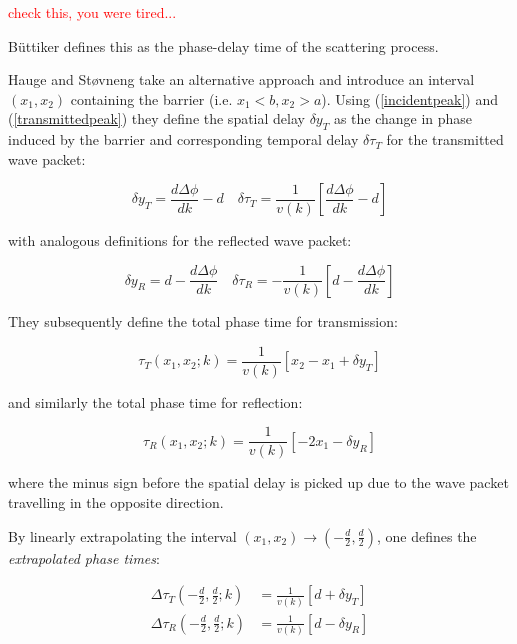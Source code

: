 \documentclass{article}
\begin{document}
\textcolor{red}{check this, you were tired...}

\noindent B{\"u}ttiker defines this as the phase-delay time of the scattering process.

Hauge and St{\o}vneng take an alternative approach and introduce an interval $(x_1, x_2)$ containing the barrier (i.e. $x_1<b,x_2>a$). Using (\ref{incidentpeak}) and (\ref{transmittedpeak}) they define the spatial delay $\delta y_T$ as the change in phase induced by the barrier and corresponding temporal delay $\delta\tau_T$ for the transmitted wave packet:

\begin{equation}
	\delta y_T = \frac{d\Delta\phi}{dk}-d \quad \delta\tau_T=\frac{1}{v(k)} \left[\frac{d\Delta\phi}{dk}-d\right]
	\label{transmittedphaseshift}
\end{equation}

\noindent with analogous definitions for the reflected wave packet:

\begin{equation}
	\delta y_R = d-\frac{d\Delta\phi}{dk} \quad \delta\tau_R=-\frac{1}{v(k)} \left[d-\frac{d\Delta\phi}{dk}\right]
	\label{reflectedphaseshift}
\end{equation}

\noindent They subsequently define the total phase time for transmission:

\begin{equation}
	\tau_T(x_1,x_2;k) = \frac{1}{v(k)}[x_2-x_1+\delta y_T]
\end{equation}

\noindent and similarly the total phase time for reflection:

\begin{equation}
	\tau_R(x_1,x_2;k) = \frac{1}{v(k)}[-2x_1-\delta y_R]
\end{equation}

\noindent where the minus sign before the spatial delay is picked up due to the wave packet travelling in the opposite direction.

\noindent By linearly extrapolating the interval $(x_1,x_2) \rightarrow (-\frac{d}{2},\frac{d}{2})$, one defines the \textit{extrapolated phase times}:

\begin{align}
	\Delta\tau_T(-\frac{d}{2},\frac{d}{2};k) &= \frac{1}{v(k)}[d+\delta y_T] \\
	\Delta\tau_R(-\frac{d}{2},\frac{d}{2};k) &= \frac{1}{v(k)}[d-\delta y_R]
\end{align}
\end{document}

